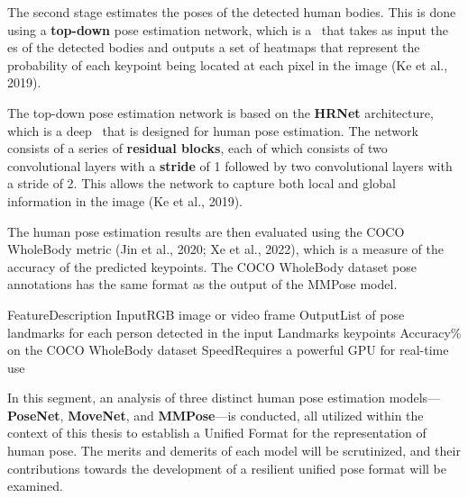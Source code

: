 The second stage estimates the poses of the detected human bodies. This is done using a {\bf top-down} pose estimation network, which is a \CNN\ that takes as input the \BBOX\-es of the detected bodies and outputs a set of heatmaps that represent the probability of each keypoint being located at each pixel in the image (\scc Ke et al., 2019).

The top-down pose estimation network is based on the {\bf HRNet} architecture, which is a deep \CNN\ that is designed for human pose estimation. The network consists of a series of {\bf residual blocks}, each of which consists of two convolutional layers with a {\bf stride} of 1 followed by two convolutional layers with a stride of 2. This allows the network to capture both local and global information in the image (\scc Ke et al., 2019).

The human pose estimation results are then evaluated using the COCO WholeBody metric (\scc Jin et al., 2020; \scc Xe et al., 2022), which is a measure of the accuracy of the predicted keypoints. The COCO WholeBody dataset pose annotations has the same format as the output of the MMPose model.

    \setupTABLE[r][1][style=bold]
    \setupTABLE[c][each][offset=3dd]
    \setupTABLE[frame=off]
    \setupTABLE[r][1][topframe=on,bottomframe=on]
    \setupTABLE[c][each][leftframe=on]
    \setupTABLE[c][1][leftframe=off]
    \bTR
        \bTD Feature\eTD\bTD    Description\eTD\eTR
    \bTR
        \bTD Input\eTD\bTD      RGB image or video frame\eTD\eTR
    \bTR
        \bTD Output\eTD\bTD     List of pose landmarks for each person detected in the input\eTD\eTR
    \bTR
        \bTD Landmarks\eTD{} keypoints\eTD\eTR
    \bTR
        \bTD Accuracy\eTD{}\% on the COCO WholeBody dataset\eTD\eTR
    \bTR
        \bTD Speed\eTD\bTD      Requires a powerful GPU for real-time use\eTD\eTR


In this segment, an analysis of three distinct human pose estimation models—{\bf PoseNet}, {\bf MoveNet}, and {\bf MMPose}—is conducted, all utilized within the context of this thesis to establish a Unified Format for the representation of human pose. The merits and demerits of each model will be scrutinized, and their contributions towards the development of a resilient unified pose format will be examined.

